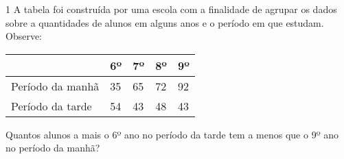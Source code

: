 

\num{1} A tabela foi construída por uma escola com a finalidade de agrupar
os dados sobre a quantidades de alunos em alguns anos e o período em que
estudam. Observe:

\begin{longtable}[]{@{}lllll@{}}
\toprule
& 6º & 7º & 8º & 9º\tabularnewline
\midrule
\endhead
Período da manhã & 35 & 65 & 72 & 92\tabularnewline
Período da tarde & 54 & 43 & 48 & 43\tabularnewline
\bottomrule
\end{longtable}

Quantos alunos a mais o 6º ano no período da tarde tem a menos que o 9º
ano no período da manhã?


